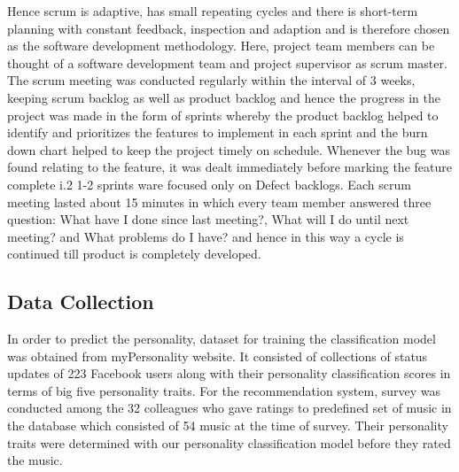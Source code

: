Hence scrum is adaptive, has small repeating cycles and there is short-term planning with constant feedback, inspection and adaption and is therefore chosen as the software development methodology. Here, project team members can be thought of a software development team and project supervisor as scrum master. The scrum meeting was conducted regularly within the interval of 3 weeks, keeping scrum backlog as well as product backlog and hence the progress in the project was made in the form of sprints whereby the product backlog helped to identify and prioritizes the features to implement in each sprint and the burn down chart helped to keep the project timely on schedule. Whenever the bug was found relating to the feature, it was dealt immediately before marking the feature complete i.2 1-2 sprints ware focused only on Defect backlogs. Each scrum meeting lasted about 15 minutes in which every team member answered three question: What have I done since last meeting?, What will I do until next meeting? and What problems do I have? and hence in this way a cycle is continued till product is completely developed.


\subsection{Data Collection}
In order to predict the personality, dataset for training the classification model was obtained from myPersonality website\cite{personality}. It consisted of collections of status updates of 223 Facebook users along with their personality classification scores in terms of big five personality traits. For the recommendation system, survey was conducted among the 32 colleagues who gave ratings to predefined set of music in the database which consisted of 54 music at the time of survey. Their personality traits were determined with our personality classification model before they rated the music.